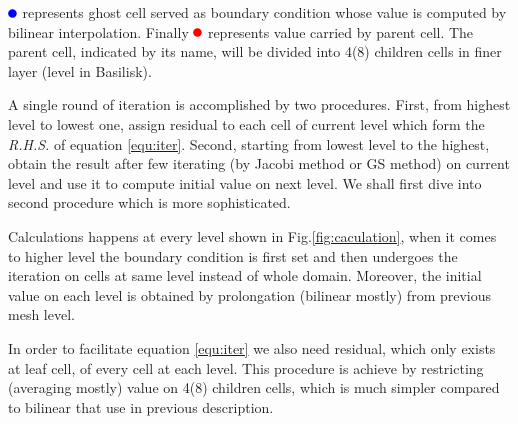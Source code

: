 \documentclass[a4paper]{article}
\newcommand{\prolong}{\tikz \fill[blue] (3pt,3pt) circle (3pt);}
\newcommand{\rest}{\tikz \fill[red] (3pt,3pt) circle (3pt);}
\begin{document}
$\prolong$ represents ghost cell served as boundary condition whose value is computed by bilinear interpolation. Finally $\rest$ represents value carried by parent cell. The parent cell, indicated by its name, will be divided into 4(8) children cells in finer layer (level in Basilisk).\cite{van2018towards}\par
A single round of iteration is accomplished by two procedures. First, from highest level to lowest one, assign residual to each cell of current level which form the \emph{R.H.S.} of equation \ref{equ:iter}. Second, starting from lowest level to the highest, obtain the result after few iterating (by Jacobi method or GS method) on current level and use it to compute initial value on next level. We shall first dive into second procedure which is more sophisticated.\par
Calculations happens at every level shown in Fig.\ref{fig:caculation}, when it comes to higher level the boundary condition is first set and then undergoes the iteration on cells at same level instead of whole domain. Moreover, the initial value on each level is obtained by prolongation (bilinear mostly) from previous mesh level.\par
In order to facilitate equation \ref{equ:iter} we also need residual, which only exists at leaf cell, of every cell at each level. This procedure is achieve by restricting\cite{popinet2015quadtree} (averaging mostly) value on 4(8) children cells, which is much simpler compared to bilinear that use in previous description.\par 
\end{document}

